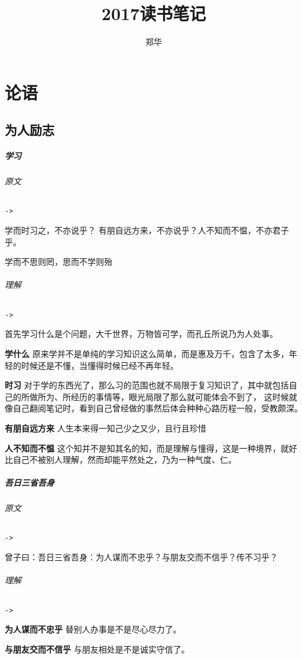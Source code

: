 \documentclass[UTF8,a4paper,8pt]{ctexbook}
\author{郑华}
\title{2017读书笔记}
\begin{document}
	\maketitle
	\tableofcontents
	

\chapter{论语}
	\section{为人励志}
		\paragraph{学习}
			\subparagraph{原文}\verb|->|
			
				学而时习之，不亦说乎？ 有朋自远方来，不亦说乎？人不知而不愠，不亦君子乎。
			
				学而不思则罔，思而不学则殆
				
			\subparagraph{理解}\verb|->|
			
				首先学习什么是个问题，大千世界，万物皆可学，而孔丘所说乃为人处事。
				
				\textbf{学什么} 原来学并不是单纯的学习知识这么简单，而是惠及万千，包含了太多，年轻的时候还是不懂，当懂得时候已经不再年轻。
				
				\textbf{时习} 对于学的东西光了，那么习的范围也就不局限于复习知识了，其中就包括自己的所做所为、所经历的事情等，眼光局限了那么就可能体会不到了， 这时候就像自己翻阅笔记时，看到自己曾经做的事然后体会种种心路历程一般，受教颇深。
				
				\textbf{有朋自远方来} 人生本来得一知己少之又少，且行且珍惜
				
				\textbf{人不知而不愠} 这个知并不是知其名的知，而是理解与懂得，这是一种境界，就好比自己不被别人理解，然而却能平然处之，乃为一种气度、仁。
		
		\paragraph{吾日三省吾身}
			\subparagraph{原文}\verb|->|
		
				曾子曰：吾日三省吾身：为人谋而不忠乎？与朋友交而不信乎？传不习乎？
			
			\subparagraph{理解}\verb|->|
			
				\textbf{为人谋而不忠乎} 替别人办事是不是尽心尽力了。
				
				\textbf{与朋友交而不信乎} 与朋友相处是不是诚实守信了。
				
\end{document}
